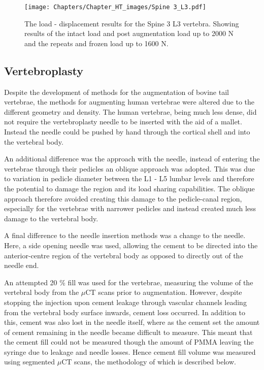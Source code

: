 \begin{figure}[ht!]
  \centering
  \texttt{[image: Chapters/Chapter\_HT\_images/Spine 3\_L3.pdf]}
  \caption{The load - displacement results for the Spine 3 L3 vertebra. Showing
    results of the intact load and post augmentation load up to 2000 N and the
    repeats and frozen load up to 1600 N.}
  \label{fig:Spine 3_L3}
\end{figure}






\subsection{Vertebroplasty}

Despite the development of methods for the augmentation of bovine tail
vertebrae, the methods for augmenting human vertebrae were altered due to the
different geometry and density. The human vertebrae, being much less dense, did
not require the vertebroplasty needle to be inserted with the aid of a mallet.
Instead the needle could be pushed by hand through the cortical shell and into
the vertebral body.

An additional difference was the approach with the needle, instead of entering
the vertebrae through their pedicles an oblique approach was adopted. This was
due to variation in pedicle diameter between the L1 - L5 lumbar levels and
therefore the potential to damage the region and its load sharing capabilities.
The oblique approach therefore avoided creating this damage to the pedicle-canal
region, especially for the vertebrae with narrower pedicles and instead created
much less damage to the vertebral body.

A final difference to the needle insertion methods was a change to the needle.
Here, a side opening needle was used, allowing the cement to be directed into
the anterior-centre region of the vertebral body as opposed to directly out of
the needle end.

An attempted 20 \% fill was used for the vertebrae, measuring the volume of the vertebral body from the $\mu$CT scans prior to augmentation.
However, despite stopping the injection upon cement leakage through vascular channels leading from the vertebral body surface inwards, cement loss occurred.
In addition to this, cement was also lost in the needle itself, where as the cement set the amount of cement remaining in the needle became difficult to measure.
This meant that the cement fill could not be measured though the amount of PMMA leaving the syringe due to leakage and needle losses.
Hence cement fill volume was measured using segmented $\mu$CT scans, the methodology of which is described below.

